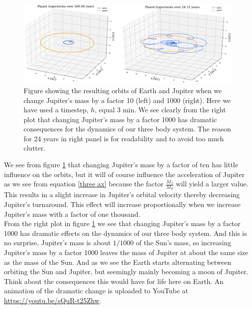 \documentclass[12pt]{article}
\numberwithin{figure}{section}
\numberwithin{table}{section}
\begin{document}
\begin{figure}[ht]
 \centerline{\includegraphics[scale = 0.4]{jupiter_combined_3D.png}}
 \caption{Figure showing the resulting orbits of Earth and Jupiter when we change Jupiter's mass by a factor 10 (left) and 1000 (right). Here we have used a timestep, $h$, equal 3 min. We see clearly from the right plot that changing Jupiter's mass by a factor 1000 has dramatic consequences for the dynamics of our three body system. The reason for 24 years in right panel is for readability and to avoid too much clutter.}
 \label{fig:jupiter mass}
\end{figure}

\noindent We see from figure \ref{fig:jupiter mass} that changing Jupiter's mass by a factor of ten has little influence on the orbits,  but it will of course influence the acceleration of Jupiter as we see from equation \ref{three ax} because the factor $\frac{M_J}{M_S}$ will yield a larger value. This results in a slight increase in Jupiter's orbital velocity thereby decreasing Jupiter's turnaround. This effect will increase proportionally when we increase Jupiter's mass with a factor of one thousand. \\

\noindent From the right plot in figure \ref{fig:jupiter mass} we see that changing Jupiter's mass by a factor 1000 has dramatic effects on the dynamics of our three body system. And this is no surprise, Jupiter's mass is about $1/1000$ of the Sun's mass, so increasing Jupiter's mass by a factor 1000 leaves the mass of Jupiter at about the same size as the mass of the Sun. And as we see the Earth starts alternating between orbiting the Sun and Jupiter, but seemingly mainly becoming a moon of Jupiter. Think about the consequences this would have for life here on Earth. An animation of the dramatic change is uploaded to YouTube at \url{https://youtu.be/sQuR-t25Zhw}. \\
\end{document}
